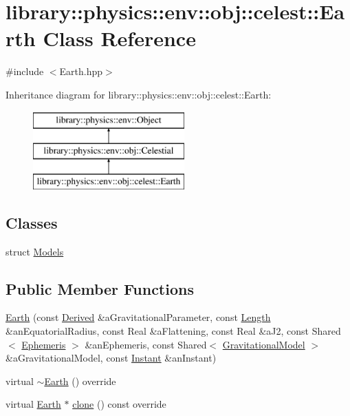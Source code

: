 \hypertarget{classlibrary_1_1physics_1_1env_1_1obj_1_1celest_1_1_earth}{}\section{library\+:\+:physics\+:\+:env\+:\+:obj\+:\+:celest\+:\+:Earth Class Reference}
\label{classlibrary_1_1physics_1_1env_1_1obj_1_1celest_1_1_earth}


{\ttfamily \#include $<$Earth.\+hpp$>$}

Inheritance diagram for library\+:\+:physics\+:\+:env\+:\+:obj\+:\+:celest\+:\+:Earth\+:\begin{figure}[H]
\begin{center}
\leavevmode
\includegraphics[height=3.000000cm]{classlibrary_1_1physics_1_1env_1_1obj_1_1celest_1_1_earth}
\end{center}
\end{figure}
\subsection*{Classes}
\begin{DoxyCompactItemize}
\item 
struct \hyperlink{structlibrary_1_1physics_1_1env_1_1obj_1_1celest_1_1_earth_1_1_models}{Models}
\end{DoxyCompactItemize}
\subsection*{Public Member Functions}
\begin{DoxyCompactItemize}
\item 
\hyperlink{classlibrary_1_1physics_1_1env_1_1obj_1_1celest_1_1_earth_a55336b7cddc00e54a9c0136deb09568f}{Earth} (const \hyperlink{classlibrary_1_1physics_1_1units_1_1_derived}{Derived} \&a\+Gravitational\+Parameter, const \hyperlink{classlibrary_1_1physics_1_1units_1_1_length}{Length} \&an\+Equatorial\+Radius, const Real \&a\+Flattening, const Real \&a\+J2, const Shared$<$ \hyperlink{classlibrary_1_1physics_1_1env_1_1_ephemeris}{Ephemeris} $>$ \&an\+Ephemeris, const Shared$<$ \hyperlink{namespacelibrary_1_1physics_1_1env_1_1obj_1_1celest_ac63145c8cbe868bd79be8f6f423c8cf4}{Gravitational\+Model} $>$ \&a\+Gravitational\+Model, const \hyperlink{classlibrary_1_1physics_1_1time_1_1_instant}{Instant} \&an\+Instant)
\item 
virtual \hyperlink{classlibrary_1_1physics_1_1env_1_1obj_1_1celest_1_1_earth_a93fbd2015a7c7d786654919197c63963}{$\sim$\+Earth} () override
\item 
virtual \hyperlink{classlibrary_1_1physics_1_1env_1_1obj_1_1celest_1_1_earth}{Earth} $\ast$ \hyperlink{classlibrary_1_1physics_1_1env_1_1obj_1_1celest_1_1_earth_aca39bec00a2046a3fcef9bf22be52428}{clone} () const override
\end{DoxyCompactItemize}
